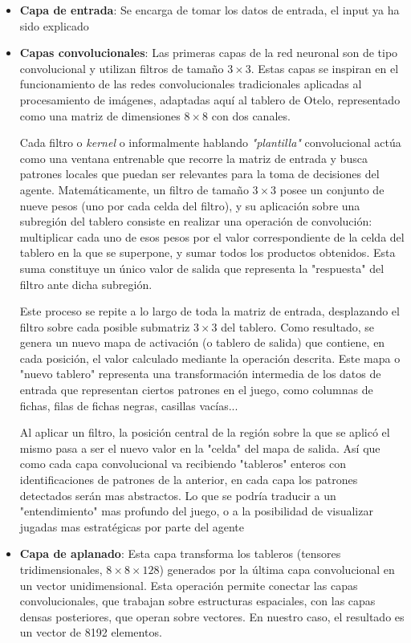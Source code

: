 \documentclass[conference]{IEEEtran}
\begin{document}
\begin{itemize}
    \item \textbf{Capa de entrada}: Se encarga de tomar los datos de entrada, el input ya ha sido explicado 
    \item \textbf{Capas convolucionales}: Las primeras capas de la red neuronal son de tipo convolucional y utilizan filtros de tamaño $3 \times 3$. Estas capas se inspiran en el funcionamiento de las redes convolucionales tradicionales aplicadas al procesamiento de imágenes, adaptadas aquí al tablero de Otelo, representado como una matriz de dimensiones $8 \times 8$ con dos canales.

Cada filtro o \textit{kernel} o informalmente hablando \textit{"plantilla"} convolucional actúa como una ventana entrenable que recorre la matriz de entrada y busca patrones locales que puedan ser relevantes para la toma de decisiones del agente. Matemáticamente, un filtro de tamaño $3 \times 3$ posee un conjunto de nueve pesos (uno por cada celda del filtro), y su aplicación sobre una subregión del tablero consiste en realizar una operación de convolución: multiplicar cada uno de esos pesos por el valor correspondiente de la celda del tablero en la que se superpone, y sumar todos los productos obtenidos. Esta suma constituye un único valor de salida que representa la "respuesta" del filtro ante dicha subregión.

Este proceso se repite a lo largo de toda la matriz de entrada, desplazando el filtro sobre cada posible submatriz $3 \times 3$ del tablero. Como resultado, se genera un nuevo mapa de activación (o tablero de salida) que contiene, en cada posición, el valor calculado mediante la operación descrita. Este mapa o "nuevo tablero" representa una transformación intermedia de los datos de entrada que representan ciertos patrones en el juego, como columnas de fichas, filas de fichas negras, casillas vacías...

 Al aplicar un filtro, la posición central de la región sobre la que se aplicó el mismo pasa a ser el nuevo valor en la "celda" del mapa de salida. Así que como cada capa convolucional va recibiendo "tableros" enteros con identificaciones de patrones de la anterior, en cada capa los patrones detectados serán mas abstractos. Lo que se podría traducir a un "entendimiento" mas profundo del juego, o a la posibilidad de visualizar jugadas mas estratégicas por parte del agente
\item \textbf{Capa de aplanado}: Esta capa transforma los tableros (tensores tridimensionales, $8 \times 8 \times 128$) generados por la última capa convolucional en un vector unidimensional. Esta operación permite conectar las capas convolucionales, que trabajan sobre estructuras espaciales, con las capas densas posteriores, que operan sobre vectores. En nuestro caso, el resultado es un vector de 8192 elementos.


\end{itemize}
\end{document}
